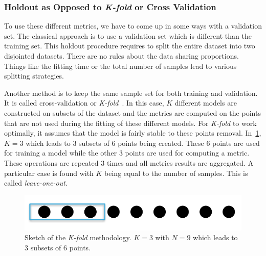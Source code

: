 \subsubsection{Holdout as Opposed to \emph{K-fold} or Cross Validation}
To use these different metrics, we have to come up in some ways with a validation set. The classical approach is to use a validation set which is different than the training set. This holdout procedure requires to split the entire dataset into two disjointed datasets. There are no rules about the data sharing proportions. Things like the fitting time or the total number of samples lead to various splitting strategies.

Another method is to keep the same sample set for both training and validation. It is called cross-validation or \emph{K-fold}~\cite{kohavi1995}. In this case, $K$ different models are constructed on subsets of the dataset and the metrics are computed on the points that are not used during the fitting of these different models. For \emph{K-fold} to work optimally, it assumes that the model is fairly stable to these points removal. In~\cref{fig:k_fold}, $K=3$ which leads to 3 subsets of 6 points being created. These 6 points are used for training a model while the other 3 points are used for computing a metric. These operations are repeated 3 times and all metrics results are aggregated. A particular case is found with $K$ being equal to the number of samples. This is called \emph{leave-one-out}.

\begin{figure}[!h]
\centering
\includegraphics[width=0.6\linewidth,keepaspectratio]{fig/literature/k_fold.png}
\caption{Sketch of the \emph{K-fold} methodology. $K=3$ with $N=9$ which leads to 3 subsets of 6 points.}
\label{fig:k_fold}
\end{figure}


